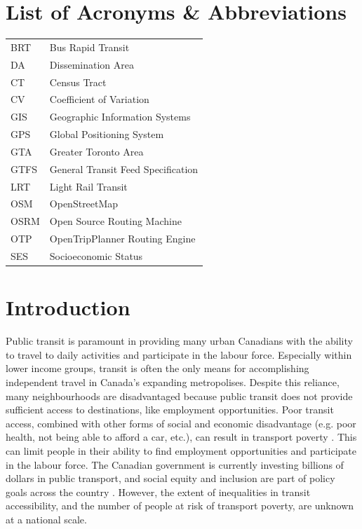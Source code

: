 \documentclass[11 pt, letterpaper]{article}
\begin{document}
{\listoftables




\newpage

\section*{List of Acronyms \& Abbreviations}


\begin{tabular}{ l l }
	BRT & Bus Rapid Transit \\
	DA & Dissemination Area \\
	CT & Census Tract \\
	CV & Coefficient of Variation \\
	GIS & Geographic Information Systems \\
	GPS & Global Positioning System \\
	GTA & Greater Toronto Area \\
	GTFS & General Transit Feed Specification \\
	LRT & Light Rail Transit \\
	OSM & OpenStreetMap \\
	OSRM & Open Source Routing Machine \\
	OTP & OpenTripPlanner Routing Engine \\
	SES & Socioeconomic Status

\end{tabular}

\newpage


\renewcommand{\thepage}{\arabic{page}}%
\setcounter{page}{1}

\section{Introduction}

Public transit is paramount in providing many urban Canadians with the ability to travel to daily activities and participate in the labour force. Especially within lower income groups, transit is often the only means for accomplishing independent travel in Canada's expanding metropolises. Despite this reliance, many neighbourhoods are disadvantaged because public transit does not provide sufficient access to destinations, like employment opportunities. Poor transit access, combined with other forms of social and economic disadvantage (e.g. poor health, not being able to afford a car, etc.), can result in transport poverty \cite{casas2007,preston2007,lucas2012}. This can limit people in their ability to find employment opportunities and participate in the labour force. The Canadian government is currently investing billions of dollars in public transport, and social equity and inclusion are part of policy goals across the country \cite{canbudget2017}. However, the extent of inequalities in transit accessibility, and the number of people at risk of transport poverty, are unknown at a national scale.

}
\end{document}
